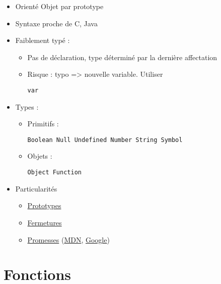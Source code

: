 \begin{itemize}
\tightlist
\item
  Orienté Objet par prototype
\item
  Syntaxe proche de C, Java
\item
  Faiblement typé :

  \begin{itemize}
  \tightlist
  \item
    Pas de déclaration, type déterminé par la dernière affectation
  \item
    Risque : typo =\textgreater{} nouvelle variable. Utiliser
    \begin{otherlanguage}{english}\texttt{var}\end{otherlanguage}
  \end{itemize}
\item
  Types :

  \begin{itemize}
  \tightlist
  \item
    Primitifs :
    \begin{otherlanguage}{english}\texttt{Boolean\ Null\ Undefined\ Number\ String\ Symbol}\end{otherlanguage}
  \item
    Objets :
    \begin{otherlanguage}{english}\texttt{Object\ Function}\end{otherlanguage}
  \end{itemize}
\item
  Particularités

  \begin{itemize}
  \tightlist
  \item
    \href{https://developer.mozilla.org/fr/docs/Web/JavaScript/Guide/Le_mod\%C3\%A8le_objet_JavaScript_en_d\%C3\%A9tails}{Prototypes}
  \item
    \href{http://www.w3schools.com/js/js_function_closures.asp}{Fermetures}
  \item
    \href{https://www.promisejs.org/}{Promesses}
    (\href{https://developer.mozilla.org/en/docs/Web/JavaScript/Reference/Global_Objects/Promise}{MDN},
    \href{https://developers.google.com/web/fundamentals/getting-started/primers/promises}{Google})
  \end{itemize}
\end{itemize}

\hypertarget{fonctions}{%
\section{Fonctions}\label{fonctions}}

